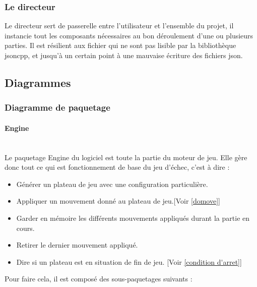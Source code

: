 \huge\documentclass{article}
\begin{document}
\subsubsection{Le directeur}
Le directeur sert de passerelle entre l'utilisateur et l'ensemble du projet, il instancie tout les composants nécessaires au bon déroulement d'une ou plusieurs parties.
Il est résilient aux fichier qui ne sont pas lisible par la bibliothèque jsoncpp, et jusqu'à un certain point à une mauvaise écriture des fichiers json.

\newpage
\subsection{Diagrammes}
\subsubsection{Diagramme de paquetage}
\paragraph{Engine}
~~\\
\newline
Le paquetage Engine du logiciel est toute la partie du moteur de jeu.\newline 
Elle gère donc tout ce qui est fonctionnement de base du jeu d'échec, c'est à dire : 
\begin{itemize}
    \item Générer un plateau de jeu avec une configuration particulière.
    \item Appliquer un mouvement donné au plateau de jeu.[Voir \ref{domove}]
    \item Garder en mémoire les différents mouvements appliqués durant la partie en cours.
    \item Retirer le dernier mouvement appliqué.
    \item Dire si un plateau est en situation de fin de jeu. [Voir \ref{condition d'arret}]
\end{itemize}
Pour faire cela, il est composé des sous-paquetages suivants :
\end{document}

